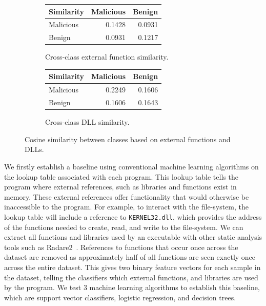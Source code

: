 \documentclass[main.tex]{subfiles}
\begin{document}
\begin{figure}[h]
    \begin{subfigure}{0.4\textwidth}
        \centering
        \begin{tabular}{@{}l|rr@{}}
        \toprule
        \textbf{Similarity} & \multicolumn{1}{l}{Malicious} & \multicolumn{1}{l}{Benign} \\ \midrule
        Malicious           & 0.1428                        & 0.0931                     \\
        Benign              & 0.0931                        & 0.1217                     \\ \bottomrule
        \end{tabular}
        \caption{Cross-class external function similarity.}
    \end{subfigure}
    \hfill
    \begin{subfigure}{0.4\textwidth}
        \centering
        \begin{tabular}{@{}l|rr@{}}
        \toprule
        \textbf{Similarity} & \multicolumn{1}{l}{Malicious} & \multicolumn{1}{l}{Benign} \\ \midrule
        Malicious           & 0.2249                        & 0.1606                     \\
        Benign              & 0.1606                        & 0.1643                     \\ \bottomrule
        \end{tabular}
        \caption{Cross-class DLL similarity.}
    \end{subfigure}
    \caption{Cosine similarity between classes based on external functions and DLLs.}
    \label{fig:similarity}
\end{figure}

\noindent 
We firstly establish a baseline using conventional machine learning algorithms on the lookup table associated with each program. This lookup table tells the program where external references, such as libraries and functions exist in memory. These external references offer functionality that would otherwise be inaccessible to the program. For example, to interact with the file-system, the lookup table will include a reference to \texttt{KERNEL32.dll}, which provides the address of the functions needed to create, read, and write to the file-system. We can extract all functions and libraries used by an executable with other static analysis tools such as Radare2~\citep{radareorganizationRadare22025}. References to functions that occur once across the dataset are removed as approximately half of all functions are seen exactly once across the entire dataset. This gives two binary feature vectors for each sample in the dataset, telling the classifiers which external functions, and libraries are used by the program. We test 3 machine learning algorithms to establish this baseline, which are support vector classifiers, logistic regression, and decision trees. 
\end{document}
